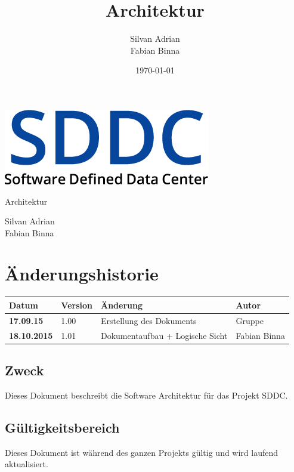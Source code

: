 \documentclass[11pt]{scrartcl}
\title{Architektur}
\author{Silvan Adrian \\ Fabian Binna}
\date{\today{}}
\begin{document}
\def\arraystretch{1.5}
\begin{titlepage}
\begin{center}
\vspace{10em}
\includegraphics[scale=2]{SDDC}
\vspace{10em}
\end{center}
\begin{center}
\huge {Architektur}
\end{center}
\begin{center}
\vspace{10em}
\LARGE {Silvan Adrian} \\
\LARGE {Fabian Binna}
\end{center}

\end{titlepage}

\newpage
\section{Änderungshistorie}
\begin{tabularx}{\linewidth}{l l X l}
\textbf{Datum} & \textbf{Version} & \textbf{Änderung}  & \textbf{Autor} \\
\hline
\textbf{17.09.15} & 1.00 & Erstellung des Dokuments & Gruppe \\
\textbf{18.10.2015} & 1.01 & Dokumentaufbau + Logische Sicht & Fabian Binna\\

\end{tabularx}

\newpage
\tableofcontents
\newpage

\subsection{Zweck}
Dieses Dokument beschreibt die Software Architektur für das Projekt SDDC.
\subsection{Gültigkeitsbereich}
Dieses Dokument ist während des ganzen Projekts gültig und wird laufend aktualisiert.
\end{document}
